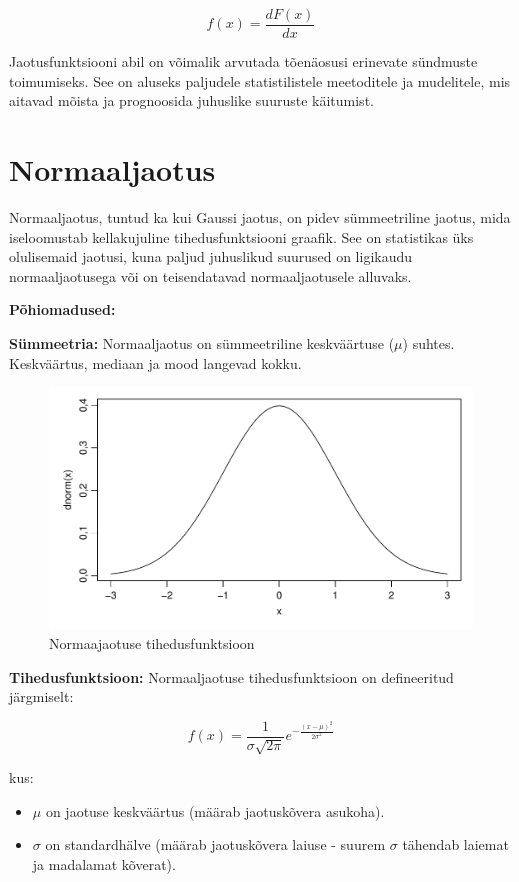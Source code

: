 \documentclass[
]{book}
\providecommand{\tightlist}{%
  \setlength{\itemsep}{0pt}\setlength{\parskip}{0pt}}
\begin{document}
\[f(x) = \frac{dF(x)}{dx}\]

Jaotusfunktsiooni abil on võimalik arvutada tõenäosusi erinevate sündmuste toimumiseks. See on aluseks paljudele statistilistele meetoditele ja mudelitele, mis aitavad mõista ja prognoosida juhuslike suuruste käitumist.

\section{Normaaljaotus}\label{normaaljaotus}

Normaaljaotus, tuntud ka kui Gaussi jaotus, on pidev sümmeetriline jaotus, mida iseloomustab kellakujuline tihedusfunktsiooni graafik. See on statistikas üks olulisemaid jaotusi, kuna paljud juhuslikud suurused on ligikaudu normaaljaotusega või on teisendatavad normaaljaotusele alluvaks.

\textbf{Põhiomadused:}

\textbf{Sümmeetria:} Normaaljaotus on sümmeetriline keskväärtuse (\(\mu\)) suhtes. Keskväärtus, mediaan ja mood langevad kokku.

\begin{figure}[H]
\includegraphics[width=0.8\linewidth]{_main_files/figure-latex/unnamed-chunk-36-1} \caption{Normaajaotuse tihedusfunktsioon}\label{fig:unnamed-chunk-36}
\end{figure}

\textbf{Tihedusfunktsioon:} Normaaljaotuse tihedusfunktsioon on defineeritud järgmiselt:

\[f(x) = \frac{1}{\sigma \sqrt{2\pi}} e^{-\frac{(x-\mu)^2}{2\sigma^2}}\]

kus:

\begin{itemize}
\tightlist
\item
  \(\mu\) on jaotuse keskväärtus (määrab jaotuskõvera asukoha).
\item
  \(\sigma\) on standardhälve (määrab jaotuskõvera laiuse - suurem \(\sigma\) tähendab laiemat ja madalamat kõverat).
\end{itemize}
\end{document}
